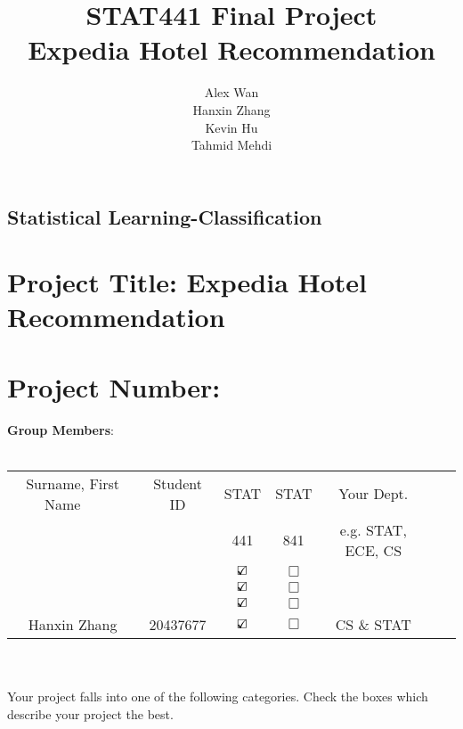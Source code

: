 \documentclass[12pt]{report}
\title{STAT441 Final Project \\ \large Expedia Hotel Recommendation}
\author{Alex Wan \\ Hanxin Zhang \\ Kevin Hu \\ Tahmid Mehdi}
\begin{document}
\thispagestyle{empty}

\begin{center}
\section*{Statistical Learning-Classification}
\end{center}




\section*{Project Title: Expedia Hotel Recommendation}
\section*{Project Number:}

{\large \textbf{Group Members}:}\\\\
\begin{tabular}{|c|c||c| c| c| c|c|}
  \hline
Surname, First Name $~~~~~$& Student ID   & STAT    & STAT &  Your Dept. \\
 $~~~~~$& & 441  & 841 &  e.g. STAT, ECE, CS\\
  \hline \hline
   &  & $\text{\rlap{$\checkmark$}}\square$     &   $\Box$& \\\hline
   &  & $\text{\rlap{$\checkmark$}}\square$       &  $\Box$& \\\hline
   &  & $\text{\rlap{$\checkmark$}}\square$     &  $\Box$& \\ \hline
Hanxin Zhang   & 20437677  & $\text{\rlap{$\checkmark$}}\square$     &  $\Box$& CS \& STAT\\
     \hline
\end{tabular}\\\\

  
Your project falls into one of the following categories. Check the
boxes which describe your project the best.
\end{document}
